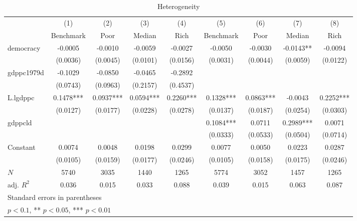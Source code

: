 \begin{table}[htbp]\centering
\def\sym#1{\ifmmode^{#1}\else\(^{#1}\)\fi}
\caption{Heterogeneity \label{tab:regression2}}
\begin{tabular}{l*{8}{c}}
\hline\hline
            &\multicolumn{1}{c}{(1)}&\multicolumn{1}{c}{(2)}&\multicolumn{1}{c}{(3)}&\multicolumn{1}{c}{(4)}&\multicolumn{1}{c}{(5)}&\multicolumn{1}{c}{(6)}&\multicolumn{1}{c}{(7)}&\multicolumn{1}{c}{(8)}\\
            &\multicolumn{1}{c}{Benchmark}&\multicolumn{1}{c}{Poor}&\multicolumn{1}{c}{Median}&\multicolumn{1}{c}{Rich}&\multicolumn{1}{c}{Benchmark}&\multicolumn{1}{c}{Poor}&\multicolumn{1}{c}{Median}&\multicolumn{1}{c}{Rich}\\
\hline
democracy   &     -0.0005   &     -0.0010   &     -0.0059   &     -0.0027   &     -0.0050   &     -0.0030   &     -0.0143** &     -0.0094   \\
            &    (0.0036)   &    (0.0045)   &    (0.0101)   &    (0.0156)   &    (0.0031)   &    (0.0044)   &    (0.0059)   &    (0.0122)   \\
[1em]
gdppc1979d  &     -0.1029   &     -0.0850   &     -0.0465   &     -0.2892   &               &               &               &               \\
            &    (0.0743)   &    (0.0963)   &    (0.2157)   &    (0.4537)   &               &               &               &               \\
[1em]
L.lgdppc    &      0.1478***&      0.0937***&      0.0594***&      0.2260***&      0.1328***&      0.0863***&     -0.0043   &      0.2252***\\
            &    (0.0127)   &    (0.0177)   &    (0.0228)   &    (0.0278)   &    (0.0137)   &    (0.0187)   &    (0.0254)   &    (0.0303)   \\
[1em]
gdppcld     &               &               &               &               &      0.1084***&      0.0711   &      0.2989***&      0.0071   \\
            &               &               &               &               &    (0.0333)   &    (0.0533)   &    (0.0504)   &    (0.0714)   \\
[1em]
Constant    &      0.0074   &      0.0048   &      0.0198   &      0.0299   &      0.0077   &      0.0050   &      0.0223   &      0.0287   \\
            &    (0.0105)   &    (0.0159)   &    (0.0177)   &    (0.0246)   &    (0.0105)   &    (0.0158)   &    (0.0175)   &    (0.0246)   \\
\hline
\(N\)       &        5740   &        3035   &        1440   &        1265   &        5774   &        3052   &        1457   &        1265   \\
adj. \(R^{2}\)&       0.036   &       0.015   &       0.033   &       0.088   &       0.039   &       0.015   &       0.063   &       0.087   \\
\hline\hline
\multicolumn{9}{l}{\footnotesize Standard errors in parentheses}\\
\multicolumn{9}{l}{\footnotesize * \(p<0.1\), ** \(p<0.05\), *** \(p<0.01\)}\\
\end{tabular}
\end{table}
